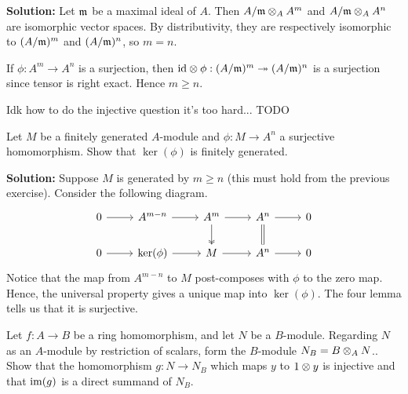 \documentclass{article}
\begin{document}
\noindent\textbf{Solution:}
Let \(\mathfrak{m}\) be a maximal ideal of \(A\).
Then \(A/\mathfrak{m} \otimes_A A^m\) and \(A/\mathfrak{m} \otimes_A A^n\) are isomorphic vector spaces.
By distributivity, they are respectively isomorphic to \((A/\mathfrak{m})^m\) and \((A/\mathfrak{m})^n\), so \(m = n\).

If \(\phi : A^m \to A^n\) is a surjection, then \(\mathrm{id} \otimes \phi : (A/\mathfrak{m})^m \twoheadrightarrow (A/\mathfrak{m})^n\) is a surjection since tensor is right exact.
Hence \(m \geq n\).

Idk how to do the injective question it's too hard... TODO

\begin{exercise}
    Let \(M\) be a finitely generated \(A\)-module and \(\phi : M \to A^n\) a surjective homomorphism.
    Show that \(\ker(\phi)\) is finitely generated.
\end{exercise}

\noindent\textbf{Solution:}
Suppose \(M\) is generated by \(m \geq n\) (this must hold from the previous exercise).
Consider the following diagram.
\[
    \begin{tikzcd}
        0 \arrow[r] & A^{m-n} \arrow[r] & A^m \arrow[r] \arrow[d, two heads] & A^n \arrow[r] \arrow[d, equal] & 0 \\
        0 \arrow[r] & \ker(\phi) \arrow[r] & M \arrow[r] & A^n \arrow[r] & 0
    \end{tikzcd}
\]
Notice that the map from \(A^{m-n}\) to \(M\) post-composes with \(\phi\) to the zero map.
Hence, the universal property gives a unique map into \(\ker(\phi)\).
The four lemma tells us that it is surjective.

\begin{exercise}
    Let \(f : A \to B\) be a ring homomorphism, and let \(N\) be a \(B\)-module.
    Regarding \(N\) as an \(A\)-module by restriction of scalars, form the \(B\)-module \(N_B = B \otimes_A N\)..
    Show that the homomorphism \(g : N \to N_B\) which maps \(y\) to \(1 \otimes y\) is injective and that \(\operatorname{im}(g)\) is a direct summand of \(N_B\).
\end{exercise}
\end{document}
